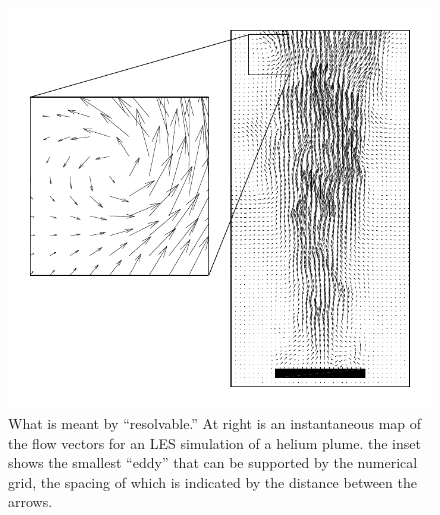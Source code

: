 \documentclass[graybox]{svmult}
\begin{document}
\begin{figure}[b]
\includegraphics[width=\textwidth]{Fig_plume_vectors}
\caption{What is meant by ``resolvable.'' At right is an instantaneous map of the flow vectors for an LES simulation of a helium plume. the inset shows the smallest ``eddy'' that can be supported by the numerical grid, the spacing of which is indicated by the distance between the arrows.}
\label{vector_plot}
\end{figure}
\end{document}

